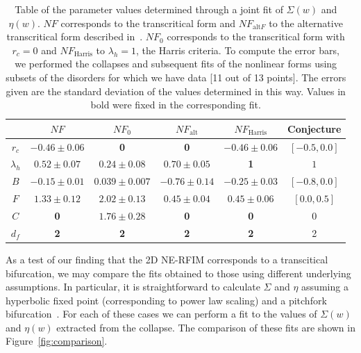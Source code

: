 \documentclass[reprint,amsmath,amssymb,aps,floatfix, prl]{revtex4-1}
\begin{document}
\begin{table}
	\centering
	\begin{tabular}{|c|c|c|c|c|c|}
	\hline
	& $NF$ & $NF_0$ & $NF_{\textrm{alt}}$ & $NF_{\textrm{Harris}}$ & Conjecture\\
	\hline
	$r_c$ & $-0.46 \pm 0.06$ & \textbf{0} &  \textbf{0} & $-0.46\pm0.06$ & $[-0.5,0.0]$\\
	$\lambda_h$ & $0.52 \pm 0.07$ & $0.24\pm0.08$ & $0.70\pm0.05$ & \textbf{1} & $1$\\
	$B$ & $-0.15 \pm 0.01$ & $0.039\pm0.007$ & $-0.76\pm0.14$ & $-0.25\pm0.03$ & $[-0.8, 0.0]$\\
	$F$ & $1.33 \pm 0.12$ & $2.02\pm0.13$ & $0.45\pm0.04$ & $0.45\pm0.06$ & $[0.0,0.5]$\\
	$C$ & \textbf{0} & $1.76\pm0.28$ &  \textbf{0} & \textbf{0} & 0\\
	$d_f$ & \textbf{2} & \textbf{2} & \textbf{2} & \textbf{2} & 2\\
	\hline
	\end{tabular}
		\caption{Table of the parameter values determined through a joint fit of $\Sigma(w)$ and $\eta(w)$. $NF$ corresponds to the transcritical form and $NF_{\textrm{alt}F}$ to the alternative transcritical form described in~\cite[Section~\ref{supp-app:well-behaved}]{RFIM2Dsupp}. $NF_0$ corresponds to the transcritical form with $r_c=0$ and $NF_{\textrm{Harris}}$ to $\lambda_h=1$, the Harris criteria. To compute the error bars,  we performed the collapses and subsequent fits of the nonlinear forms using subsets of the disorders for which we have data [11 out of 13 points]. The errors given are the standard deviation of the values determined in this way. Values in bold were fixed in the corresponding fit. }
	\label{tab:params}
\end{table}
%
As a test of our finding that the 2D NE-RFIM corresponds to a transcitical bifurcation, we may compare the fits obtained to those using different underlying assumptions. In particular, it is straightforward to calculate $\Sigma$ and $\eta$ assuming a hyperbolic fixed point (corresponding to power law scaling) and a pitchfork bifurcation~\cite[Section~\ref{supp-app:compare}]{RFIM2Dsupp}. For each of these cases we can perform a fit to the values of $\Sigma(w)$ and $\eta(w)$ extracted from the collapse. The comparison of these fits are shown in Figure~\ref{fig:comparison}.\par
%
\end{document}
